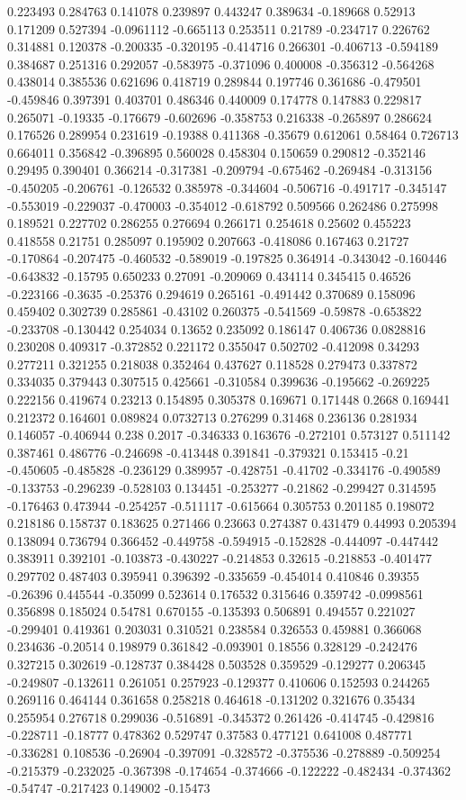 0.223493 0.284763 0.141078 0.239897 0.443247 0.389634 -0.189668 0.52913 0.171209 0.527394 -0.0961112 -0.665113 0.253511 0.21789 -0.234717 0.226762 0.314881 0.120378 -0.200335 -0.320195 -0.414716 0.266301 -0.406713 -0.594189 0.384687 0.251316 0.292057 -0.583975 -0.371096 0.400008 -0.356312 -0.564268 0.438014 0.385536 0.621696 0.418719 0.289844 0.197746 0.361686 -0.479501 -0.459846 0.397391 0.403701 0.486346 0.440009 0.174778 0.147883 0.229817 0.265071 -0.19335 -0.176679 -0.602696 -0.358753 0.216338 -0.265897 0.286624 0.176526 0.289954 0.231619 -0.19388 0.411368 -0.35679 0.612061 0.58464 0.726713 0.664011 0.356842 -0.396895 0.560028 0.458304 0.150659 0.290812 -0.352146 0.29495 0.390401 0.366214 -0.317381 -0.209794 -0.675462 -0.269484 -0.313156 -0.450205 -0.206761 -0.126532 0.385978 -0.344604 -0.506716 -0.491717 -0.345147 -0.553019 -0.229037 -0.470003 -0.354012 -0.618792 0.509566 0.262486 0.275998 0.189521 0.227702 0.286255 0.276694 0.266171 0.254618 0.25602 0.455223 0.418558 0.21751 0.285097 0.195902 0.207663 -0.418086 0.167463 0.21727 -0.170864 -0.207475 -0.460532 -0.589019 -0.197825 0.364914 -0.343042 -0.160446 -0.643832 -0.15795 0.650233 0.27091 -0.209069 0.434114 0.345415 0.46526 -0.223166 -0.3635 -0.25376 0.294619 0.265161 -0.491442 0.370689 0.158096 0.459402 0.302739 0.285861 -0.43102 0.260375 -0.541569 -0.59878 -0.653822 -0.233708 -0.130442 0.254034 0.13652 0.235092 0.186147 0.406736 0.0828816 0.230208 0.409317 -0.372852 0.221172 0.355047 0.502702 -0.412098 0.34293 0.277211 0.321255 0.218038 0.352464 0.437627 0.118528 0.279473 0.337872 0.334035 0.379443 0.307515 0.425661 -0.310584 0.399636 -0.195662 -0.269225 0.222156 0.419674 0.23213 0.154895 0.305378 0.169671 0.171448 0.2668 0.169441 0.212372 0.164601 0.089824 0.0732713 0.276299 0.31468 0.236136 0.281934 0.146057 -0.406944 0.238 0.2017 -0.346333 0.163676 -0.272101 0.573127 0.511142 0.387461 0.486776 -0.246698 -0.413448 0.391841 -0.379321 0.153415 -0.21 -0.450605 -0.485828 -0.236129 0.389957 -0.428751 -0.41702 -0.334176 -0.490589 -0.133753 -0.296239 -0.528103 0.134451 -0.253277 -0.21862 -0.299427 0.314595 -0.176463 0.473944 -0.254257 -0.511117 -0.615664 0.305753 0.201185 0.198072 0.218186 0.158737 0.183625 0.271466 0.23663 0.274387 0.431479 0.44993 0.205394 0.138094 0.736794 0.366452 -0.449758 -0.594915 -0.152828 -0.444097 -0.447442 0.383911 0.392101 -0.103873 -0.430227 -0.214853 0.32615 -0.218853 -0.401477 0.297702 0.487403 0.395941 0.396392 -0.335659 -0.454014 0.410846 0.39355 -0.26396 0.445544 -0.35099 0.523614 0.176532 0.315646 0.359742 -0.0998561 0.356898 0.185024 0.54781 0.670155 -0.135393 0.506891 0.494557 0.221027 -0.299401 0.419361 0.203031 0.310521 0.238584 0.326553 0.459881 0.366068 0.234636 -0.20514 0.198979 0.361842 -0.093901 0.18556 0.328129 -0.242476 0.327215 0.302619 -0.128737 0.384428 0.503528 0.359529 -0.129277 0.206345 -0.249807 -0.132611 0.261051 0.257923 -0.129377 0.410606 0.152593 0.244265 0.269116 0.464144 0.361658 0.258218 0.464618 -0.131202 0.321676 0.35434 0.255954 0.276718 0.299036 -0.516891 -0.345372 0.261426 -0.414745 -0.429816 -0.228711 -0.18777 0.478362 0.529747 0.37583 0.477121 0.641008 0.487771 -0.336281 0.108536 -0.26904 -0.397091 -0.328572 -0.375536 -0.278889 -0.509254 -0.215379 -0.232025 -0.367398 -0.174654 -0.374666 -0.122222 -0.482434 -0.374362 -0.54747 -0.217423 0.149002 -0.15473 